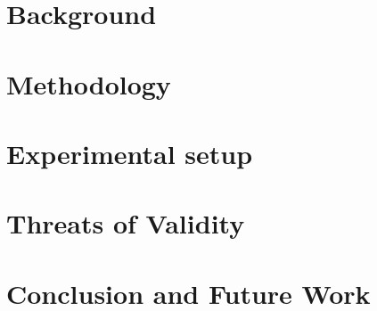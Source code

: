 \documentclass[conference,10pt]{IEEEtran}
\begin{document}
\section{Background}
\label{sec:background}



\section{Methodology}
\label{sec:method}




\section{Experimental setup}
\label{sec:experiments}





% 


\section{Threats of Validity}
\label{sec:threats}




\section{Conclusion and Future Work}
\label{sec:conclusion}


\balance


\end{document}
